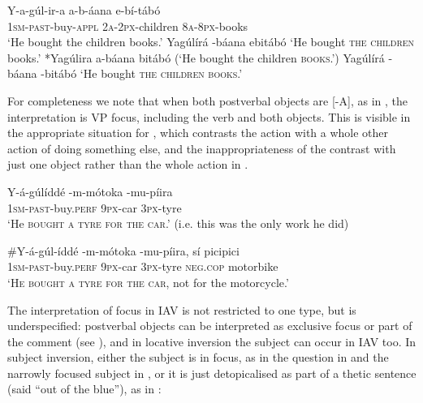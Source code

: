 \documentclass[output=paper]{langsci/langscibook}
\begin{document}
\ea\label{ex:vanderwal:5}
\settowidth{\jamwidth}{[-A, +A]}
\ea\label{ex:vanderwal:5a}{
\gll Y-a-gúl-ir-a      a-b-áana    e-bí-tábó  \\
       1\textsc{sm}-\textsc{past}-buy-\textsc{appl }   \textsc{2a-2px}-children  \textsc{8a-8px}-books\\\jambox{\textup{[+A, +A]}}
}
\glt   ‘He bought the children books.’             
\ex\label{ex:vanderwal:5b}  Yagúlírá {\longrule}-báana ebitábó             \jambox{\textup{[-A, +A]}}
\glt   ‘He bought \textsc{the children} books.’           
\ex \label{ex:vanderwal:5c} *Yagúlira a-báana {\longrule}bitábó            \jambox{\textup{[+A, -A]}}
\glt   (‘He bought the children \textsc{books}.’)           
\ex  \label{ex:vanderwal:5d} {Yagúlírá {\longrule}-báana {\longrule}-bitábó}            \jambox{\textup{[-A, -A]}}
\glt  ‘He bought \textsc{the children books}.’ \citep[228--229]{HymanKatamba1993}
\z
\z

For completeness we note that when both postverbal objects are [-A], as in , the interpretation is VP focus, including the verb and both objects. This is visible in the appropriate situation for , which contrasts the action with a whole other action of doing something else, and the inappropriateness of the contrast with just one object rather than the whole action in .

\settowidth{\jamwidth}{[-A, +A]}
\ea\label{ex:vanderwal:6}{
\gll Y-á-gúlíddé    {\longrule}-m-mótoka    {\longrule}-mu-píira      \\
 \textsc{1sm-past}-buy.\textsc{perf}       \textsc{9px}-car              \textsc{3px}-tyre\\\jambox{\textup{[-A, -A]}}
}
\glt‘He \textsc{bought a tyre for the car}.’ (i.e. this was the only work he did) 
\z

\settowidth{\jamwidth}{[-A, +A]}
\ea\label{ex:vanderwal:7}{
\gll \#Y-á-gúl-íddé      {\longrule}-m-mótoka    {\longrule}-mu-píira,  sí    picipici\\
     \textsc{1sm-past}-buy.\textsc{perf   }    \textsc{9px}-car       \textsc{3px}-tyre   \textsc{neg}.\textsc{cop}  motorbike\\\jambox{\textup{[-A, -A]}}
}
\glt   ‘\textsc{He bought a tyre for the car}, not for the motorcycle.’
\z

The interpretation of focus in IAV is not restricted to one type, but is underspecified: postverbal objects can be interpreted as exclusive focus or part of the comment (see ), and in locative inversion the subject can occur in IAV too. In subject inversion, either the subject is in focus, as in the question in  and the narrowly focused subject in , or it is just detopicalised as part of a thetic sentence (said “out of the blue”), as in :
\end{document}
